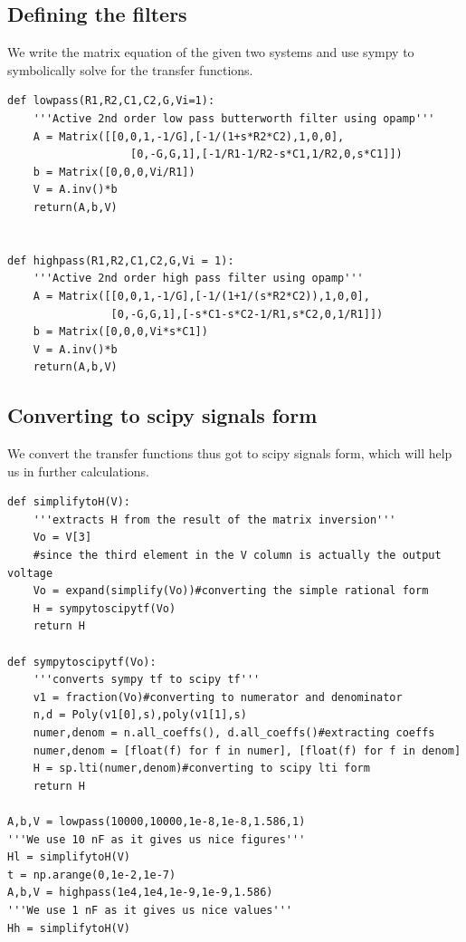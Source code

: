 \documentclass[11pt, a4paper]{article}
\begin{document}
\subsection{Defining the filters}
{
We write the matrix equation of the given two systems and use sympy to symbolically solve for the transfer functions.
}
\begin{verbatim}
def lowpass(R1,R2,C1,C2,G,Vi=1):
    '''Active 2nd order low pass butterworth filter using opamp''' 
    A = Matrix([[0,0,1,-1/G],[-1/(1+s*R2*C2),1,0,0],
                   [0,-G,G,1],[-1/R1-1/R2-s*C1,1/R2,0,s*C1]])
    b = Matrix([0,0,0,Vi/R1])
    V = A.inv()*b
    return(A,b,V)


def highpass(R1,R2,C1,C2,G,Vi = 1):
    '''Active 2nd order high pass filter using opamp'''
    A = Matrix([[0,0,1,-1/G],[-1/(1+1/(s*R2*C2)),1,0,0],
                [0,-G,G,1],[-s*C1-s*C2-1/R1,s*C2,0,1/R1]])
    b = Matrix([0,0,0,Vi*s*C1])
    V = A.inv()*b
    return(A,b,V)
\end{verbatim}

\subsection{Converting to scipy signals form}
{
We convert the transfer functions thus got to scipy signals form, which will help us in further calculations.
}
\begin{verbatim}
def simplifytoH(V):
    '''extracts H from the result of the matrix inversion'''
    Vo = V[3]
    #since the third element in the V column is actually the output voltage
    Vo = expand(simplify(Vo))#converting the simple rational form
    H = sympytoscipytf(Vo)
    return H

def sympytoscipytf(Vo):
    '''converts sympy tf to scipy tf'''
    v1 = fraction(Vo)#converting to numerator and denominator
    n,d = Poly(v1[0],s),poly(v1[1],s)
    numer,denom = n.all_coeffs(), d.all_coeffs()#extracting coeffs
    numer,denom = [float(f) for f in numer], [float(f) for f in denom]
    H = sp.lti(numer,denom)#converting to scipy lti form
    return H

A,b,V = lowpass(10000,10000,1e-8,1e-8,1.586,1)
'''We use 10 nF as it gives us nice figures'''
Hl = simplifytoH(V)
t = np.arange(0,1e-2,1e-7)
A,b,V = highpass(1e4,1e4,1e-9,1e-9,1.586)
'''We use 1 nF as it gives us nice values'''
Hh = simplifytoH(V)

\end{verbatim}
\end{document}
